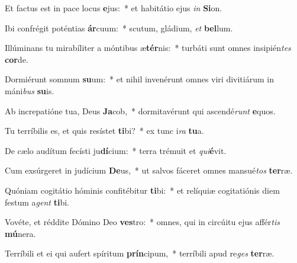 \item Et factus est in pace locus \textbf{e}jus:~* et habitátio ejus \textit{in} \textbf{Si}on.
\item Ibi confrégit poténtias \textbf{ár}cuum:~* scutum, gládium, \textit{et} \textbf{bel}lum.
\item Illúminans tu mirabíliter a móntibus æ\textbf{tér}nis:~* turbáti sunt omnes insipién\textit{tes} \textbf{cor}de.
\item Dormiérunt somnum \textbf{su}um:~* et nihil invenérunt omnes viri divitiárum in máni\textit{bus} \textbf{su}is.
\item Ab increpatióne tua, Deus \textbf{Ja}cob,~* dormitavérunt qui ascendé\textit{runt} \textbf{e}quos.
\item Tu terríbilis es, et quis resístet \textbf{ti}bi?~* ex tunc i\textit{ra} \textbf{tu}a.
\item De cælo audítum fecísti ju\textbf{dí}cium:~* terra trémuit et \textit{qui}\textbf{é}vit.
\item Cum exsúrgeret in judícium \textbf{De}us,~* ut salvos fáceret omnes mansué\textit{tos} \textbf{ter}ræ.
\item Quóniam cogitátio hóminis confitébitur \textbf{ti}bi:~* et relíquiæ cogitatiónis diem festum a\textit{gent} \textbf{ti}bi.
\item Vovéte, et réddite Dómino Deo \textbf{ves}tro:~* omnes, qui in circúitu ejus affér\textit{tis} \textbf{mú}nera.
\item Terríbili et ei qui aufert spíritum \textbf{prín}cipum,~* terríbili apud re\textit{ges} \textbf{ter}ræ.
